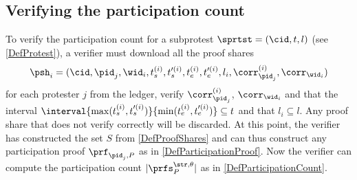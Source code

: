\normalsize


\subsection{Verifying the participation count}%
\label{ProtocolVerification}


To verify the participation count for a subprotest \(\sprtst = (\cid, t, l)\) 
(see \cref{DefProtest}), a verifier must download all the proof shares \[
  \psh_i =   (\cid, \pid_j, \wid_i, t_s^{(i)}, t_s^{\prime (i)}, t_e^{(i)}, 
  t_e^{\prime   (i)}, l_i, \corr_{\pid_j}^{(i)}, \corr_{\wid_i})
\] for each protester \(j\) from the ledger, verify \(\corr_{\pid_j}^{(i)}\), 
\(\corr_{\wid_i}\) and that the interval \(\interval{\max(t_s^{(i)}, 
    t_s^{\prime (i)})}{\min(t_e^{(i)}, t_e^{\prime (i)})}\subseteq t\) and that 
\(l_i\subseteq  l\).
Any proof share that does not verify correctly will be discarded.
At this point, the verifier has constructed the set \(S\) from 
\cref{DefProofShares} and can thus construct any participation proof 
\(\prf_{\pid_j, P}\) as in \cref{DefParticipationProof}.
Now the verifier can compute the participation count \(|\prfs_P^{\str, 
    \theta}|\) as in \cref{DefParticipationCount}.

